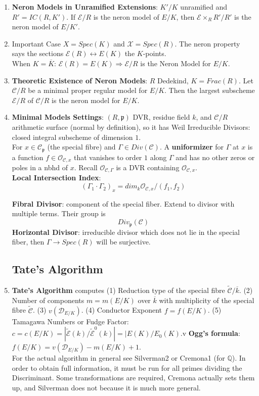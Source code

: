 \documentclass{article}
\newcommand{\Q}{\mathbb{Q}}
\newcommand{\DD}{\mathcal{D}}
\newcommand{\EE}{\mathcal{E}}
\newcommand{\OO}{\mathcal{O}}
\newcommand{\pp}{\mathfrak{p}}
\newcommand{\ra}{\rightarrow}
\newcommand{\Ra}{\Rightarrow}
\newcommand{\lra}{\leftrightarrow}
\newcommand{\ACK}{\overline{K}}
\begin{document}
\begin{multicols}{2}
\begin{enumerate}
\item \textbf{Neron Models in Unramified Extensions}: $K'/K$ unramified and $R' = IC(R,K')$. If $\EE/R$ is the neron model of $E/K$, then $\EE \times_R R'/R'$ is the neron model of $E/K'$.

\item Important Case $X = Spec(K)$ and $\mathcal{X} = Spec(R)$. The neron property says the sections $\EE(R) \lra E(K)$ the $K$-points. \\

When $K = \ACK$: $\EE(R) = E(K) \Ra \EE/R$ is the Neron Model for $E/K$. 

\item \textbf{Theoretic Existence of Neron Models}: $R$ Dedekind, $K = Frac(R)$. Let $\mathcal{C}/R$ be a minimal proper regular model for $E/K$. Then the  largest subscheme $\EE/R$ of $\mathcal{C}/R$ is the neron model for $E/K$. 

\item \textbf{Minimal Models Settings}: $(R,\pp)$ DVR, residue field $k$, and $\mathcal{C}/R$ arithmetic surface (normal by definition), so it has Weil Irreducible Divisors: closed integral subscheme of dimension $1$. \\

For $x \in \mathcal{C}_\pp$ (the special fibre) and $\Gamma \in Div(\mathcal{C})$. A \textbf{uniformizer} for $\Gamma$ at $x$ is a function $f \in \OO_{\mathcal{C},x}$ that vanishes to order $1$ along $\Gamma$ and has no other zeros or poles in a nbhd of $x$. Recall $\OO_{\mathcal{C}, \Gamma}$ is a DVR containing $\OO_{\mathcal{C}, x}$. \\

\textbf{Local Intersection Index}:
\[(\Gamma_1 \cdot \Gamma_2)_x = dim_k \OO_{\mathcal{C},x}/(f_1,f_2)\]

\textbf{Fibral Divisor}: component of the special fiber. Extend to divisor with multiple terms. Their group is 
\[Div_\pp(\mathcal{C})\]
\textbf{Horizontal Divisor}: irreducible divisor which does not lie in the special fiber, then $\Gamma \ra Spec(R)$ will be surjective. 
\subsection{Tate's Algorithm}
\item \textbf{Tate's Algorithm} computes (1) Reduction type of the special fibre $\tilde{\mathcal{C}}/\overline{k}$. (2) Number of components $m = m(E/K)$ over $\overline{k}$ with multiplicity of the special fibre $\tilde{\mathcal{C}}$. (3) $v(\DD_{E/K})$. (4) Conductor Exponent $f = f(E/K)$. (5) Tamagawa Numbers or Fudge Factor: $c = c(E/K) = |\tilde{\EE}(k)/\tilde{\EE}^0(k)| = |E(K)/E_0(K)$.v \textbf{Ogg's formula}: $f(E/K) = v(\DD_{E/K}) - m(E/K) + 1$.\\
For the actual algorithm in general see Silverman2 or Cremona1 (for $\Q$). In order to obtain full information, it must be run for all primes dividing the Discriminant. Some transformations are required, Cremona actually sets them up, and Silverman does not because it is much more general.  

\end{enumerate}
\end{multicols}
\end{document}
